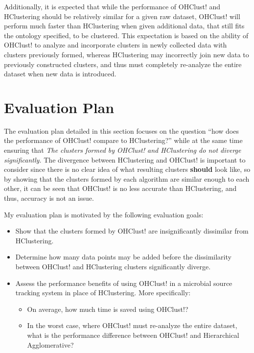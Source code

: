 \documentclass[12pt]{ucthesis}
\begin{document}
      Additionally, it is expected that while the performance of OHClust! and
      HClustering should be relatively similar for a given raw dataset,
      OHClust! will perform much faster than HClustering when given additional
      data, that still fits the ontology specified, to be clustered. This
      expectation is based on the ability of OHClust! to analyze and
      incorporate clusters in newly collected data with clusters previously
      formed, whereas HClustering may incorrectly join new data to previously
      constructed clusters, and thus must completely re-analyze the entire
      dataset when new data is introduced.

   \section{Evaluation Plan}\label{sec:eval_plan}
      The evaluation plan detailed in this section focuses on the question
      ``how does the performance of OHClust! compare to HClustering?'' while at
      the same time ensuring that \textit{The clusters formed by OHClust! and
      HClustering do not diverge significantly.} The divergence between
      HClustering and OHClust! is important to consider since there is no clear idea
      of what resulting clusters \textbf{should} look like, so by showing that
      the clusters formed by each algorithm are similar enough to each other,
      it can be seen that OHClust! is no less accurate than HClustering, and
      thus, accuracy is not an issue.

      My evaluation plan is motivated by the following evaluation goals:
      \begin{itemize}
         \item Show that the clusters formed by OHClust! are insignificantly
               dissimilar from HClustering.
         \item Determine how many data points may be added before the
               dissimilarity between OHClust! and HClustering clusters
               significantly diverge.
         \item Assess the performance benefits of using OHClust! in a
               microbial source tracking system in place of HClustering. More
               specifically:
               \begin{itemize}
                  \item On average, how much time is saved using OHClust!?
                  \item In the worst case, where OHClust! must re-analyze the
                        entire dataset, what is the performance difference
                        between OHClust! and Hierarchical Agglomerative?
               \end{itemize}
      \end{itemize}
\end{document}
